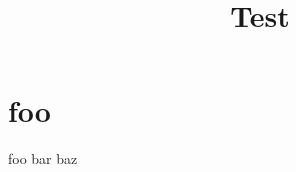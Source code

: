 \documentclass{jydiss}
\title{Test}
\begin{document}
\mainmatter
\chapter{foo}
foo
\newpage
bar
\newpage
baz
\end{document}
